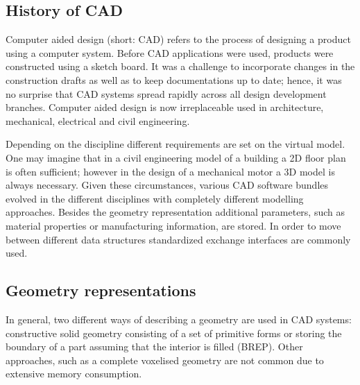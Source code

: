 \subsection{History of CAD}
Computer aided design (short: CAD) refers to the process of designing a product using a computer system. Before CAD applications were used, products were constructed using a sketch board. It was a challenge to incorporate changes in the construction drafts as well as to keep documentations up to date; hence, it was no surprise that CAD systems spread rapidly across all design development branches. Computer aided design is now irreplaceable used in architecture, mechanical, electrical and civil engineering.

Depending on the discipline different requirements are set on the virtual model. One may imagine that in a civil engineering model of a building a 2D floor plan is often sufficient; however in the design of a mechanical motor a 3D model is always necessary. Given these circumstances, various CAD software bundles evolved in the different disciplines with completely different modelling approaches. Besides the geometry representation additional parameters, such as material properties or manufacturing information, are stored. In order to move between different data structures standardized exchange interfaces are commonly used.
\subsection{Geometry representations}
In general, two different ways of describing a geometry are used in CAD systems: constructive solid geometry consisting of a set of primitive forms or storing the boundary of a part assuming that the interior is filled (BREP). Other approaches, such as a complete voxelised geometry are not common due to extensive memory consumption.
